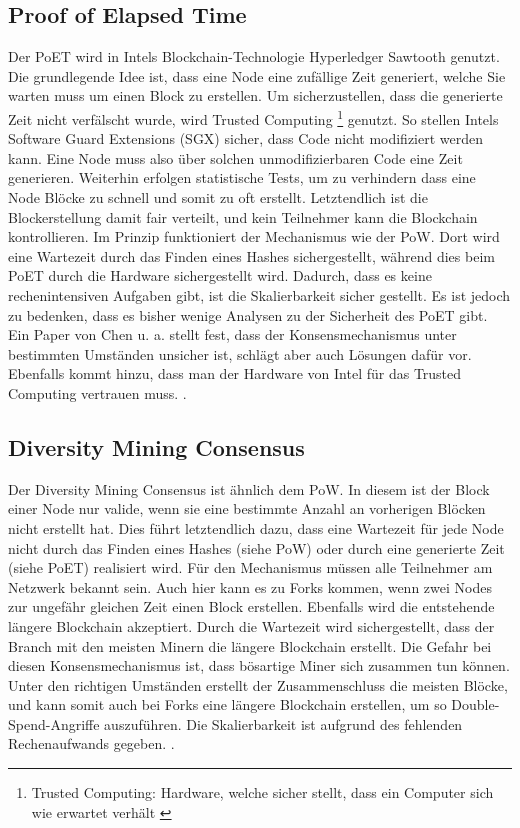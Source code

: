\subsection{Proof of Elapsed Time}
Der PoET wird in Intels Blockchain-Technologie Hyperledger Sawtooth genutzt. Die grundlegende Idee ist, dass eine Node eine zufällige Zeit generiert, welche Sie warten muss um einen Block zu erstellen. Um sicherzustellen, dass die generierte Zeit nicht verfälscht wurde, wird Trusted Computing \footnote{Trusted Computing: Hardware, welche sicher stellt, dass ein Computer sich wie erwartet verhält \cite{MitchellTrustedComputing2005}} genutzt. So stellen Intels Software Guard Extensions (SGX) sicher, dass Code nicht modifiziert werden kann. Eine Node muss also über solchen unmodifizierbaren Code eine Zeit generieren. Weiterhin erfolgen statistische Tests, um zu verhindern dass eine Node Blöcke zu schnell und somit zu oft erstellt. Letztendlich ist die Blockerstellung damit fair verteilt, und kein Teilnehmer kann die Blockchain kontrollieren. Im Prinzip funktioniert der Mechanismus wie der PoW. Dort wird eine Wartezeit durch das Finden eines Hashes sichergestellt, während dies beim PoET durch die Hardware sichergestellt wird. Dadurch, dass es keine rechenintensiven Aufgaben gibt, ist die Skalierbarkeit sicher gestellt. Es ist jedoch zu bedenken, dass es bisher wenige Analysen zu der Sicherheit des PoET gibt. Ein Paper von Chen u. a. stellt fest, dass der Konsensmechanismus unter bestimmten Umständen unsicher ist, schlägt aber auch Lösungen dafür vor. Ebenfalls kommt hinzu, dass man der Hardware von Intel für das Trusted Computing vertrauen muss. \cite{ChenSecurityAnalysisProofofElapsedTime2017}.

\subsection{Diversity Mining Consensus}
Der Diversity Mining Consensus ist ähnlich dem PoW. In diesem ist der Block einer Node nur valide, wenn sie eine bestimmte Anzahl an vorherigen Blöcken nicht erstellt hat. Dies führt letztendlich dazu, dass eine Wartezeit für jede Node nicht durch das Finden eines Hashes (siehe PoW) oder durch eine generierte Zeit (siehe PoET) realisiert wird. Für den Mechanismus müssen alle Teilnehmer am Netzwerk bekannt sein. Auch hier kann es zu Forks kommen, wenn zwei Nodes zur ungefähr gleichen Zeit einen Block erstellen. Ebenfalls wird die entstehende längere Blockchain akzeptiert. Durch die Wartezeit wird sichergestellt, dass der Branch mit den meisten Minern die längere Blockchain erstellt. Die Gefahr bei diesen Konsensmechanismus ist, dass bösartige Miner sich zusammen tun können. Unter den richtigen Umständen erstellt der Zusammenschluss die meisten Blöcke, und kann somit auch bei Forks eine längere Blockchain erstellen, um so Double-Spend-Angriffe auszuführen. Die Skalierbarkeit ist aufgrund des fehlenden Rechenaufwands gegeben. \cite{GreenspanMultiChainPrivateBlockchain2015}\cite{CachinBlockchainConsensusProtocols2017}.

